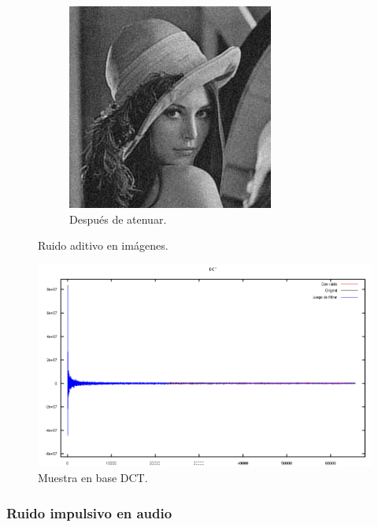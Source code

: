 \documentclass[a4paper,10pt,twoside]{article}
\begin{document}
\begin{figure}[H]
\begin{subfigure}[b]{0.45\textwidth}
    \includegraphics[width=\textwidth]{graficos/lena_aditivo_atenuar_muestra.png}
    \caption{Después de atenuar.}
  \end{subfigure}
  \caption{Ruido aditivo en imágenes.}
\end{figure}

\begin{figure}[H]
  \centering
  \includegraphics[width=15cm]{graficos/lena_aditivo_atenuar_dct.png} 
  \caption{Muestra en base DCT.}
\end{figure}


\subsubsection{Ruido impulsivo en audio}
\end{document}
